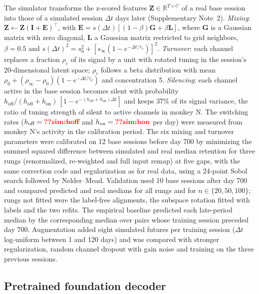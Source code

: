 \documentclass[pdflatex,sn-nature]{sn-jnl}
\begin{document}
The simulator transforms the z-scored features $\mathbf{Z} \in \mathbb{R}^{T\times C}$ of a real base session into those
of a simulated session $\Delta t$ days later (Supplementary Note~2). \textit{Mixing}: $\mathbf{Z} \leftarrow
\mathbf{Z}(\mathbf{I} + \mathbf{E})^\top$, with $\mathbf{E} = s(\Delta t)[(1 - \beta)\mathbf{G} + \beta\mathbf{L}]$, where
$\mathbf{G}$ is a Gaussian matrix with zero diagonal, $\mathbf{L}$ a Gaussian matrix restricted to grid neighbors,
$\beta = 0.5$ and $s(\Delta t)^2 = s_0^2 + [s_\infty(1 - e^{-\Delta t/\tau_s})]^2$. \textit{Turnover}: each channel
replaces a fraction $\rho_c$ of its signal by a unit with rotated tuning in the session's 20-dimensional latent space;
$\rho_c$ follows a beta distribution with mean $\rho_0 + (\rho_\infty - \rho_0)(1 - e^{-\Delta t/\tau_\rho})$ and
concentration 5. \textit{Silencing}: each channel active in the base session becomes silent with probability
$h_{\text{off}}/(h_{\text{off}} + h_{\text{on}})\,[1 - e^{-(h_{\text{off}} + h_{\text{on}})\Delta t}]$ and keeps 37\% of
its signal variance, the ratio of tuning strength of silent to active channels in monkey N. The switching rates
($h_{\text{off}} = \val{sim:hoff}$ and $h_{\text{on}} = \val{sim:hon}$ per day) were measured from monkey N's activity in
the calibration period. The six mixing and turnover parameters were calibrated on 12 base sessions before day 700 by
minimizing the summed squared difference between simulated and real median retention for three rungs (renormalized,
re-weighted and full input remap) at five gaps, with the same correction code and regularization as for real data,
using a 24-point Sobol search\cite{sobol1967} followed by Nelder--Mead\cite{nelder1965}. Validation used 10 base sessions
after day 700 and compared predicted and real medians for all rungs and for $n \in \{20, 50, 100\}$; rungs not fitted
were the label-free alignments, the subspace rotation fitted with labels and the two refits. The empirical baseline
predicted each late-period median by the corresponding median over pairs whose training session preceded day 700.
Augmentation added eight simulated futures per training session ($\Delta t$ log-uniform between 1 and 120 days) and was
compared with stronger regularization, random channel dropout with gain noise\cite{sussillo2016} and training on the
three previous sessions.

\subsection*{Pretrained foundation decoder}
\end{document}
